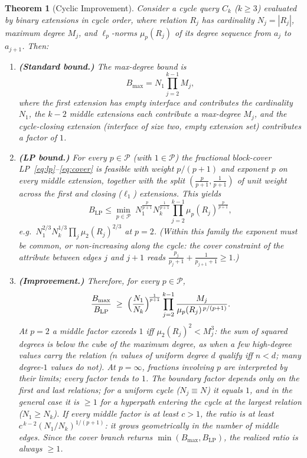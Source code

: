 \documentclass[conference]{IEEEtran}
\newtheorem{theorem}{Theorem}
\begin{document}
\begin{theorem}[Cyclic Improvement]
\label{thm:cyclic}
Consider a cycle query $C_k$ ($k \ge 3$) evaluated by binary
extensions in cycle order, where relation $R_j$ has cardinality
$N_j = |R_j|$, maximum degree $M_j$, and $\ell_p$-norms $\mu_p(R_j)$ of
its degree sequence from $a_j$ to $a_{j+1}$.
Then:
\begin{enumerate}
\item \textbf{(Standard bound.)} The max-degree bound is
\[
B_{\max} = N_1 \prod_{j=2}^{k-1} M_j ,
\]
where the first extension has empty interface and contributes the
cardinality $N_1$, the $k-2$ \emph{middle} extensions each contribute
a max-degree $M_j$, and the cycle-closing extension (interface of size
two, empty extension set) contributes a factor of $1$.
\item \textbf{(LP bound.)} For every $p \in \mathcal{P}$ (with $1 \in \mathcal{P}$) the fractional
block-cover LP~\eqref{eq:lp}--\eqref{eq:cover} is feasible with weight
$p/(p{+}1)$ and exponent $p$ on every middle extension, together with
the split $(\frac{p}{p+1}, \frac{1}{p+1})$ of unit weight across the first
and closing ($\ell_1$) extensions. This yields
\[
B_{\mathrm{LP}} \le \min_{p \in \mathcal{P}}\; N_1^{\frac{p}{p+1}} N_k^{\frac{1}{p+1}}
\prod_{j=2}^{k-1} \mu_p(R_j)^{\frac{p}{p+1}} ,
\]
e.g.\ $N_1^{2/3} N_k^{1/3} \prod_j \mu_2(R_j)^{2/3}$ at $p{=}2$. (Within this family the exponent must be common, or non-increasing along the cycle: the cover
constraint of the attribute between edges $j$ and $j{+}1$ reads
$\frac{p_j}{p_j+1} + \frac{1}{p_{j+1}+1} \ge 1$.)
\item \textbf{(Improvement.)} Therefore, for every $p \in \mathcal{P}$,
\[
\frac{B_{\max}}{B_{\mathrm{LP}}} \;\ge\;
\Bigl(\frac{N_1}{N_k}\Bigr)^{\!\frac{1}{p+1}}
\prod_{j=2}^{k-1}
\frac{M_j}{\mu_p(R_j)^{\,p/(p+1)}} .
\]
At $p{=}2$ a middle factor exceeds $1$ iff $\mu_2(R_j)^2 < M_j^3$: the
sum of squared degrees is below the cube of the maximum degree, as when
a few high-degree values carry the relation ($n$ values of uniform degree
$d$ qualify iff $n<d$; many degree-$1$ values do not). At $p=\infty$, fractions involving $p$ are interpreted by their limits; every factor tends to $1$.
The boundary factor depends only on the first and last relations;
for a \emph{uniform} cycle ($N_j \equiv N$) it equals $1$, and in the
general case it is $\ge 1$ for a hyperpath entering the cycle at the
largest relation ($N_1 \ge N_k$). If every middle factor is at least
$c > 1$, the ratio is at least $c^{\,k-2}(N_1/N_k)^{1/(p+1)}$: it grows
geometrically in the number of middle edges. Since the cover branch returns
$\min(B_{\max}, B_{\mathrm{LP}})$, the realized ratio is always
$\ge 1$.
\end{enumerate}
\end{theorem}
\end{document}

